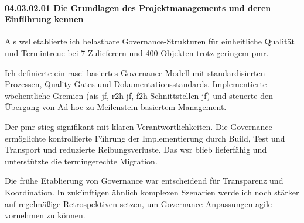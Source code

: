 \paragraph*{04.03.02.01 Die Grundlagen des Projektmanagements und deren Einführung kennen}
\label{para:04.03.02.01_GrundlagenProjektmanagement}

\par Als \gls{wsl} etablierte ich belastbare Governance-Strukturen für einheitliche Qualität und Termintreue bei 7 Zulieferern und 400 Objekten trotz geringem \gls{pmr}.

\par Ich definierte ein \gls{rasci}-basiertes Governance-Modell mit standardisierten Prozessen, Quality-Gates und Dokumentationsstandards. Implementierte wöchentliche Gremien (\gls{ais}-\gls{jf}, \gls{r2h}-\gls{jf}, \gls{f2h}-Schnittstellen-\gls{jf}) und steuerte den Übergang von Ad-hoc zu Meilenstein-basiertem Management.

\par Der \gls{pmr} stieg signifikant mit klaren Verantwortlichkeiten. Die Governance ermöglichte kontrollierte Führung der Implementierung durch Build, Test und Transport und reduzierte Reibungsverluste. Das \gls{wsr} blieb lieferfähig und unterstützte die termingerechte Migration.

\par Die frühe Etablierung von Governance war entscheidend für Transparenz und Koordination. In zukünftigen ähnlich komplexen Szenarien werde ich noch stärker auf regelmäßige Retrospektiven setzen, um Governance-Anpassungen agile vornehmen zu können.